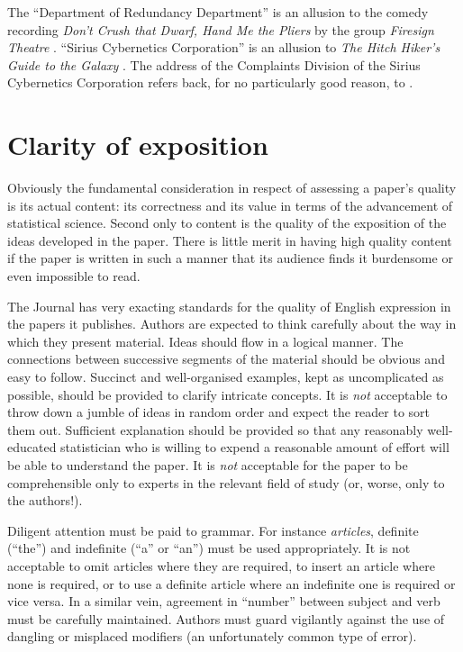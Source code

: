 \documentclass[times, doublespace]{anzsauth}
\begin{document}
The ``Department of Redundancy Department'' is an allusion to
the comedy recording \textit{Don't Crush that Dwarf, Hand Me the
Pliers} by the group \textit{Firesign Theatre} \citep{Firesign1970}.
``Sirius Cybernetics Corporation'' is an allusion to \textit{The
Hitch Hiker's Guide to the Galaxy} \citep{Adams1979}.  The address
of the Complaints Division of the Sirius Cybernetics Corporation
refers back, for no particularly good reason, to \cite{Firesign1970}.

\section{Clarity of exposition}
\label{sec:clarExpos}

Obviously the fundamental consideration in respect of assessing a
paper's quality is its actual content: its correctness and its value
in terms of the advancement of statistical science.  Second only to
content is the quality of the exposition of the ideas developed in
the paper.  There is little merit in having high quality content
if the paper is written in such a manner that its audience finds
it burdensome or even impossible to read.

The Journal has very exacting standards for the quality of English
expression in the papers it publishes.  Authors are expected to
think carefully about the way in which they present material.
Ideas should flow in a logical manner.  The connections between
successive segments of the material should be obvious and easy to
follow.  Succinct and well-organised examples, kept as uncomplicated
as possible, should be provided to clarify intricate concepts.
It is \emph{not} acceptable to throw down a jumble of ideas in random
order and expect the reader to sort them out.  Sufficient explanation
should be provided so that any reasonably well-educated statistician
who is willing to expend a reasonable amount of effort will be able
to understand the paper.  It is \emph{not} acceptable for the paper
to be comprehensible only to experts in the relevant field of study
(or, worse, only to the authors!).

Diligent attention must be paid to grammar.  For instance
\emph{articles}, definite (``the'') and indefinite (``a'' or
``an'') must be used appropriately.   It is not acceptable to omit
articles where they are required, to insert an article where none
is required, or to use a definite article where an indefinite one is
required or vice versa.  In a similar vein, agreement in ``number''
between subject and verb must be carefully maintained.  Authors must
guard vigilantly against the use of dangling or misplaced modifiers
(an unfortunately common type of error).
\end{document}
